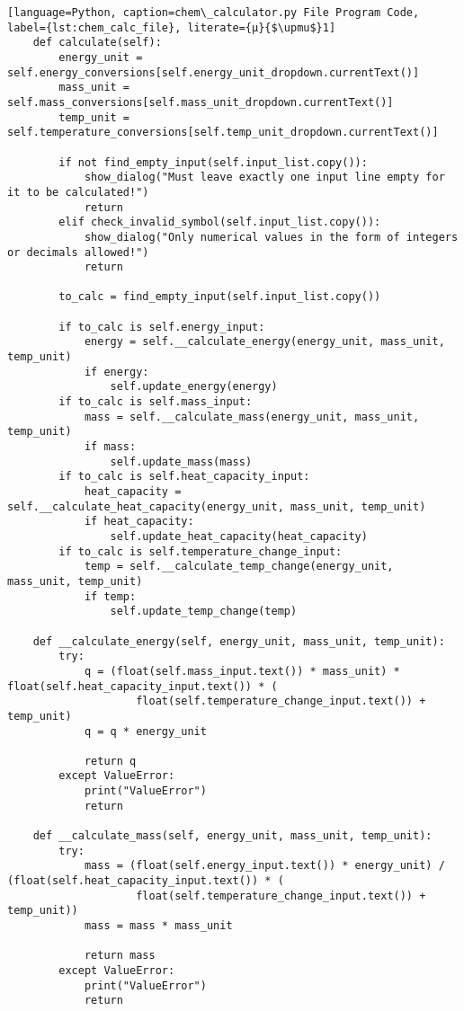\begin{lstlisting}[language=Python, caption=chem\_calculator.py File Program Code, label={lst:chem_calc_file}, literate={μ}{$\upmu$}1]
    def calculate(self):
        energy_unit = self.energy_conversions[self.energy_unit_dropdown.currentText()]
        mass_unit = self.mass_conversions[self.mass_unit_dropdown.currentText()]
        temp_unit = self.temperature_conversions[self.temp_unit_dropdown.currentText()]

        if not find_empty_input(self.input_list.copy()):
            show_dialog("Must leave exactly one input line empty for it to be calculated!")
            return
        elif check_invalid_symbol(self.input_list.copy()):
            show_dialog("Only numerical values in the form of integers or decimals allowed!")
            return

        to_calc = find_empty_input(self.input_list.copy())

        if to_calc is self.energy_input:
            energy = self.__calculate_energy(energy_unit, mass_unit, temp_unit)
            if energy:
                self.update_energy(energy)
        if to_calc is self.mass_input:
            mass = self.__calculate_mass(energy_unit, mass_unit, temp_unit)
            if mass:
                self.update_mass(mass)
        if to_calc is self.heat_capacity_input:
            heat_capacity = self.__calculate_heat_capacity(energy_unit, mass_unit, temp_unit)
            if heat_capacity:
                self.update_heat_capacity(heat_capacity)
        if to_calc is self.temperature_change_input:
            temp = self.__calculate_temp_change(energy_unit, mass_unit, temp_unit)
            if temp:
                self.update_temp_change(temp)

    def __calculate_energy(self, energy_unit, mass_unit, temp_unit):
        try:
            q = (float(self.mass_input.text()) * mass_unit) * float(self.heat_capacity_input.text()) * (
                    float(self.temperature_change_input.text()) + temp_unit)
            q = q * energy_unit

            return q
        except ValueError:
            print("ValueError")
            return

    def __calculate_mass(self, energy_unit, mass_unit, temp_unit):
        try:
            mass = (float(self.energy_input.text()) * energy_unit) / (float(self.heat_capacity_input.text()) * (
                    float(self.temperature_change_input.text()) + temp_unit))
            mass = mass * mass_unit

            return mass
        except ValueError:
            print("ValueError")
            return


\end{lstlisting}
